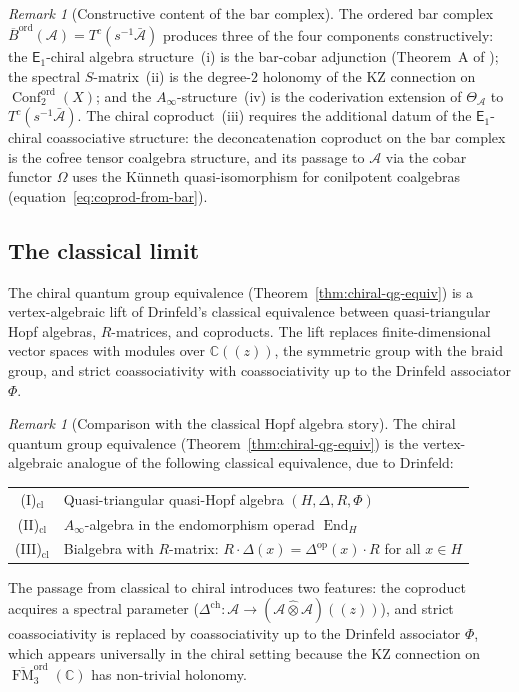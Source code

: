 \documentclass[11pt,reqno]{amsart}
\theoremstyle{definition}
\theoremstyle{remark}
\newtheorem{remark}[theorem]{Remark}
\newcommand{\cA}{\mathcal{A}}
\newcommand{\Ainf}{A_{\infty}}
\newcommand{\Eone}{\mathsf{E}_{1}}
\DeclareMathOperator{\End}{End}
\DeclareMathOperator{\Conf}{Conf}
\DeclareMathOperator{\FM}{FM}
\newcommand{\Barord}{\overline{B}^{\mathrm{ord}}}
\newcommand{\CC}{\mathbb{C}}
\newcommand{\op}{\mathrm{op}}
\numberwithin{equation}{section}
\begin{document}
\begin{remark}[Constructive content of the bar complex]
\label{rem:chiral-yangian-bar}
The ordered bar complex
$\Barord(\cA) = T^c(s^{-1}\bar{\cA})$ produces three of the
four components constructively: the $\Eone$-chiral algebra
structure~(i) is the bar-cobar adjunction
\textup{(}Theorem~A of \cite{Lorgat26I}\textup{)}; the
spectral $S$-matrix~(ii) is the degree-$2$ holonomy of the
KZ connection on $\Conf_2^{\mathrm{ord}}(X)$; and the
$\Ainf$-structure~(iv) is the coderivation extension of
$\Theta_\cA$ to $T^c(s^{-1}\bar{\cA})$. The chiral
coproduct~(iii) requires the additional datum of the
$\Eone$-chiral coassociative structure: the deconcatenation coproduct on the
bar complex is the cofree tensor coalgebra structure, and its passage
to $\cA$ via the cobar functor $\Omega$ uses the
K\"unneth quasi-isomorphism for conilpotent coalgebras
\textup{(}equation~\textup{\eqref{eq:coprod-from-bar}}\textup{)}.
\end{remark}


\subsection{The classical limit}
\label{subsec:classical-limit}

The chiral quantum group equivalence
(Theorem~\ref{thm:chiral-qg-equiv}) is a vertex-algebraic
lift of Drinfeld's classical equivalence between
quasi-triangular Hopf algebras, $R$-matrices, and
coproducts. The lift replaces finite-dimensional vector
spaces with modules over $\CC((z))$, the symmetric group
with the braid group, and strict coassociativity with
coassociativity up to the Drinfeld associator $\Phi$.

\begin{remark}[Comparison with the classical Hopf algebra
story]
\label{rem:classical-hopf}
The chiral quantum group equivalence
(Theorem~\ref{thm:chiral-qg-equiv}) is the
vertex-algebraic analogue of the following classical
equivalence, due to Drinfeld:
\begin{center}
\renewcommand{\arraystretch}{1.3}
\begin{tabular}{cl}
\textup{(I)$_{\mathrm{cl}}$} &
  Quasi-triangular quasi-Hopf algebra $(H, \Delta, R, \Phi)$ \\
\textup{(II)$_{\mathrm{cl}}$} &
  $\Ainf$-algebra in the endomorphism operad $\End_H$ \\
\textup{(III)$_{\mathrm{cl}}$} &
  Bialgebra with $R$-matrix: $R \cdot \Delta(x)
  = \Delta^{\op}(x) \cdot R$ for all $x \in H$
\end{tabular}
\end{center}
The passage from classical to chiral introduces two features:
the coproduct acquires a spectral parameter
($\Delta^{\mathrm{ch}} \colon
\cA \to (\cA \mathbin{\hat{\otimes}} \cA)((z))$),
and strict coassociativity is replaced by coassociativity
up to the Drinfeld associator $\Phi$, which appears
universally in the chiral setting because the KZ connection
on $\overline{\FM}_3^{\mathrm{ord}}(\CC)$ has non-trivial
holonomy.
\end{remark}
\end{document}
